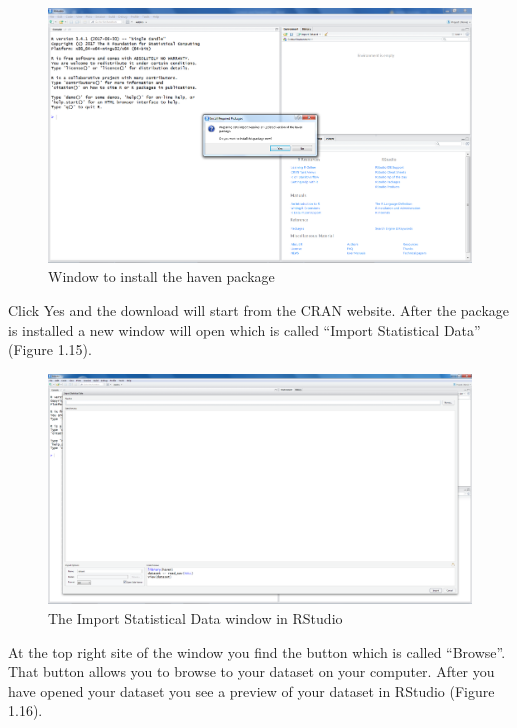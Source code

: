 \documentclass[]{book}
\theoremstyle{definition}
\theoremstyle{definition}
\theoremstyle{definition}
\theoremstyle{remark}
\begin{document}
\begin{figure}

{\centering \includegraphics[width=0.9\linewidth]{images/fig1.14} 

}

\caption{Window to install the haven package}\label{fig:fig14}
\end{figure}

Click Yes and the download will start from the CRAN website. After the
package is installed a new window will open which is called ``Import
Statistical Data'' (Figure 1.15).

\begin{figure}

{\centering \includegraphics[width=0.9\linewidth]{images/fig1.15} 

}

\caption{The Import Statistical Data window in RStudio}\label{fig:fig15}
\end{figure}

At the top right site of the window you find the button which is called
``Browse''. That button allows you to browse to your dataset on your
computer. After you have opened your dataset you see a preview of your
dataset in RStudio (Figure 1.16).
\end{document}
